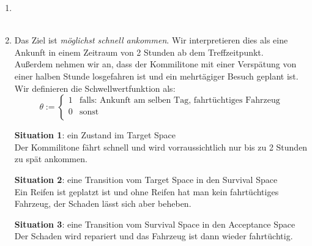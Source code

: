 \documentclass[paper=a4, %
         fontsize=10,  %
         oneside,        %
         headsepline,    %
         notitlepage    %
]{scrartcl}              %
\begin{document}
\begin{enumerate}

\item \leavevmode\vadjust{\vspace{-\baselineskip}} \\
\\

\item
Das Ziel ist \textit{möglichst schnell ankommen}. Wir interpretieren dies als eine Ankunft in einem Zeitraum von 2 Stunden ab dem Treffzeitpunkt. \\
Außerdem nehmen wir an, dass der Kommilitone mit einer Verspätung von einer halben Stunde losgefahren ist und ein mehrtägiger Besuch geplant ist.\\
Wir definieren die Schwellwertfunktion als:
\[
    \theta := 
    \left\{
    \begin{array}{ll}
        1 & \text{falls: Ankunft am selben Tag, fahrtüchtiges Fahrzeug}\\
        0 & \text{sonst}\\
    \end{array}
    \right.
\]

\textbf{Situation 1}: ein Zustand im Target Space \\
Der Kommilitone fährt schnell und wird vorraussichtlich nur bis zu 2 Stunden zu spät ankommen.

\textbf{Situation 2}: eine Transition vom Target Space in den Survival Space\\
Ein Reifen ist geplatzt ist und ohne Reifen hat man kein fahrtüchtiges Fahrzeug, der Schaden lässt sich aber beheben.

\textbf{Situation 3}: eine Transition vom Survival Space in den Acceptance Space\\
Der Schaden wird repariert und das Fahrzeug ist dann wieder fahrtüchtig.


\end{enumerate}
\end{document}
